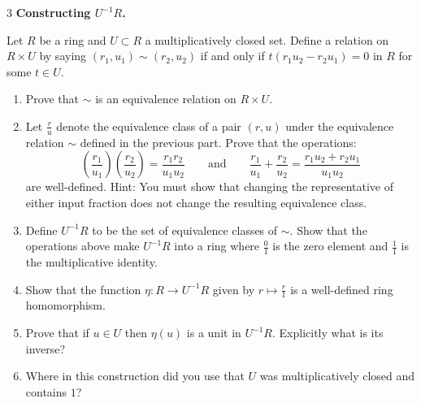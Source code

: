 \documentclass[Notebook.tex]{subfiles}
\begin{document}
\newpage 

\begin{problem}{3}
	\textbf{Constructing $U^{-1}R$.} 
	
	Let $R$ be a ring and $U \subset R$ a multiplicatively closed set. Define a relation on $R\times U$ by saying $(r_{1},u_{1}) \sim (r_{2},u_{2})$ if and only if $t(r_1u_{2}-r_{2}u_{1})=0$ in $R$ for some $t\in U$. 
	\begin{enumerate}
		\item Prove that $\sim$ is an equivalence relation on $R\times U$. 
		\item Let $\frac{r}{u}$ denote the equivalence class of a pair $(r,u)$ under the equivalence relation $\sim$ defined in the previous part. Prove that the operations:
		\[
		\left(\frac{r_{1}}{u_1}\right)\left(\frac{r_2}{u_2}\right)=\frac{r_1r_2}{u_1u_2} \quad \quad \text{and} \quad \quad \frac{r_{1}}{u_1}+\frac{r_2}{u_2} = 	\frac{r_1u_{2}+r_{2}u_{1}}{u_1u_2}
		\]
		are well-defined. Hint: You must show that changing the representative of either input fraction does not change the resulting equivalence class.
		\item Define $U^{-1}R$ to be the set of equivalence classes of $\sim$. Show that the operations above make $U^{-1}R$ into a ring where $\frac{0}{1}$ is the zero element and $\frac{1}{1}$ is the multiplicative identity. 
		\item Show that the function $\eta:R \to U^{-1}R$ given by $r\mapsto \frac{r}{1}$ is a well-defined ring homomorphism. 
		\item Prove that if $u \in U$ then $\eta(u)$ is a unit in $U^{-1}R$. Explicitly what is its inverse?
		\item Where in this construction did you use that $U$ was multiplicatively closed and contains $1$?
	\end{enumerate}
\end{problem} 
\end{document}
